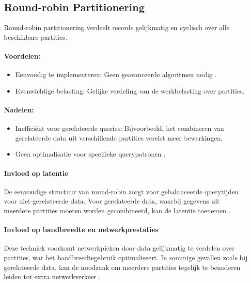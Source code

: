\subsection{Round-robin Partitionering}
Round-robin partitionering verdeelt records gelijkmatig en cyclisch over alle beschikbare partities.
 
\paragraph{Voordelen:}
\begin{itemize}
    \item Eenvoudig te implementeren: Geen geavanceerde algoritmen nodig \autocite{Mahmud2020}.
    \item Evenwichtige belasting: Gelijke verdeling van de werkbelasting over partities.
\end{itemize}
 
\paragraph{Nadelen:}
\begin{itemize}
    \item Inefficiënt voor gerelateerde queries: Bijvoorbeeld, het combineren van gerelateerde data uit verschillende partities vereist meer bewerkingen.
    \item Geen optimalisatie voor specifieke querypatronen \autocite{Ponnusamy2024}.
\end{itemize}
 
\paragraph{Invloed op latentie} 
De eenvoudige structuur van round-robin zorgt voor gebalanceerde querytijden voor niet-gerelateerde data. Voor gerelateerde data, waarbij gegevens uit meerdere partities moeten worden gecombineerd, kan de latentie toenemen \autocite{Mahmud2020}.
 
\paragraph{Invloed op bandbreedte en netwerkprestaties} 
Deze techniek voorkomt netwerkpieken door data gelijkmatig te verdelen over partities, wat het bandbreedtegebruik optimaliseert. In sommige gevallen zoals bij gerelateerde data, kan de noodzaak om meerdere partities tegelijk te benaderen leiden tot extra netwerkverkeer \autocite{Mahmud2020}.
 
